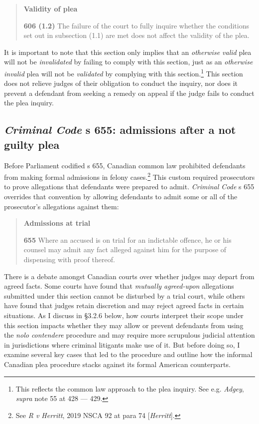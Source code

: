 \begin{quote}
    \onehalfspacing
    \textbf{Validity of plea}
    
    \textbf{606 (1.2)} The failure of the court to fully inquire whether the conditions set out in subsection (1.1) are met does not affect the validity of the plea.
\end{quote}
It is important to note that this section only implies that an \textit{otherwise valid} plea will not be \textit{invalidated} by failing to comply with this section, just as an \textit{otherwise invalid} plea will not be \textit{validated} by complying with this section.\footnote{This reflects the common law approach to the plea inquiry. See e.g. \textit{Adgey}, \textit{supra} note 55 at 428 — 429.} This section does not relieve judges of their obligation to conduct the inquiry, nor does it prevent a defendant from seeking a remedy on appeal if the judge fails to conduct the plea inquiry.

\subsection{\textit{Criminal Code} s 655: admissions after a not guilty plea}

Before Parliament codified s 655, Canadian common law prohibited defendants from making formal admissions in felony cases.\footnote{See \textit{R v Herritt}, 2019 NSCA 92 at para 74 [\textit{Herritt}].} This custom required prosecutors to prove allegations that defendants were prepared to admit. \textit{Criminal Code} s 655 overrides that convention by allowing defendants to admit some or all of the prosecutor's allegations against them:

\begin{quote}
    \singlespacing
    \textbf{Admissions at trial}
    
    \textbf{655} Where an accused is on trial for an indictable offence, he or his counsel may admit any fact alleged against him for the purpose of dispensing with proof thereof.
\end{quote}
There is a debate amongst Canadian courts over whether judges may depart from agreed facts. Some courts have found that \textit{mutually agreed-upon} allegations submitted under this section cannot be disturbed by a trial court, while others have found that judges retain discretion and may reject agreed facts in certain situations. As I discuss in \S 3.2.6 below, how courts interpret their scope under this section impacts whether they may allow or prevent defendants from using the \textit{nolo contendere} procedure and may require more scrupulous judicial attention in jurisdictions where criminal litigants make use of it. But before doing so, I examine several key cases that led to the procedure and outline how the informal Canadian plea procedure stacks against its formal American counterparts.
